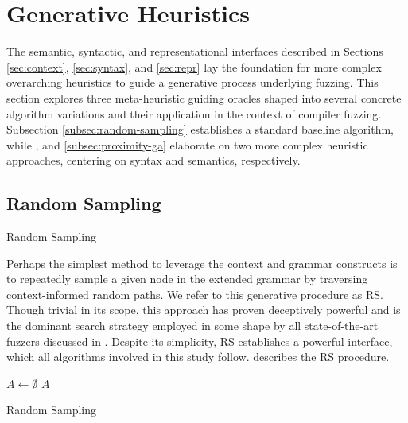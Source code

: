 \section{\label{sec:heuristics}Generative Heuristics}

The semantic, syntactic, and representational interfaces
described in Sections \ref{sec:context}, \ref{sec:syntax}, and \ref{sec:repr}
lay the foundation for more complex overarching heuristics
to guide a generative process underlying fuzzing.
This section explores three meta-heuristic guiding oracles shaped into
several concrete algorithm variations and their application
in the context of compiler fuzzing.
Subsection \ref{subsec:random-sampling} establishes a standard baseline algorithm,
while , and \ref{subsec:proximity-ga}
elaborate on two more complex heuristic approaches,
centering on syntax and semantics, respectively.

\subsection{\label{subsec:random-sampling} Random Sampling}

 {Random Sampling}

Perhaps the simplest method to leverage the context and grammar constructs
is to repeatedly sample a given node in the extended grammar by traversing
context-informed random paths.
We refer to this generative procedure as \Gls{RS}.
Though trivial in its scope, this approach has proven deceptively powerful
and is the dominant search strategy employed in some shape by all state-of-the-art
fuzzers discussed in .
Despite its simplicity, \gls{RS} establishes a powerful interface, which
all algorithms involved in this study follow.
 describes the \gls{RS} procedure.

\begin{algorithm}

	\BlankLine
	\DontPrintSemicolon
	$A \gets \emptyset$\;
	\Return $A$\;

	\caption{Random Sampling}
	\label{alg:rs}
\end{algorithm}



